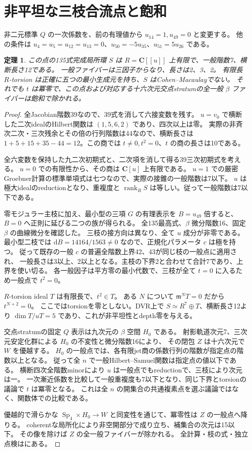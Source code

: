 \documentclass[11pt,a4paper]{ltjsarticle}
\newcommand{\CC}{\mathbf C}
\newcommand{\dd}{\mathrm d}
\DeclareMathOperator{\Sp}{Sp}
\DeclareMathOperator{\rank}{rank}
\newtheorem{theorem}{定理}[section]
\theoremstyle{remark}
\begin{document}
\section{非平坦な三枝合流点と飽和}
非二元標準 $Q$ の一次係数を、前の有理値から $u_{14}=1,u_{49}=0$ と変更する。
他の条件は $u_4=u_5=u_{12}=u_{13}=0$、$u_{50}=-5u_{35}$、$u_{51}=5u_{26}$ である。
\begin{theorem}\label{thm:zero49-v36}
この点の135式完成局所環 $S$ は $R=\CC[[u]]$ 上有限で、一般階数7、横断長さ12である。
一般ファイバーは三因子からなり、長さは2、3、2。
有限長 $R$-torsion は正確に五つの最小生成元を持ち、$S$ はCohen--Macaulayでない。
それでも $t$ は冪零で、この点および対応する十六次元交点stratumの全一般 $\beta$ ファイバーは飽和で除かれる。
\end{theorem}
\begin{proof}
全Jacobian階数39なので、39式を消して六接変数を残す。
$u=v_0$ で横断した二次idealのHilbert関数は $(1,5,6,2)$ であり、四次以上は零。
実際の非斉次二次・三次残余とその倍の行列階数は44なので、横断長さは
$1+5+15+35-44=12$。この商では $t\ne0,t^2=0$、$t$ の商の長さは10である。

全六変数を保持した九二次初期式と、二次項を消して得る39三次初期式を考える。
$u=0$ での有限性から、その商は $\CC[u]$ 上有限である。
$u=1$ での厳密Groebner計算の標準単項式は七つなので、実際の接錐の一般階数は7以下。
$u$ は極大idealのreductionとなり、重複度と $\rank_R S$ は等しい。従って一般階数は7以下である。

零モジュラー主枝に加え、最小型の三項 $G$ の有理表示を $B=u_{49}$ 倍すると、
$B=0$ へ正則に延びる二つの族が得られる。
全135最高式、$\beta$ 微分階数16、固定 $\beta$ の曲線微分を確認した。
三枝の接方向は異なり、全て $u$ 成分が非零である。
最小型二枝では $\dd B=14164/1563\ne0$ なので、正規化パラメータ $c$ は極を持つ。
従って既存の一般 $c$ の普遍全階数上界42、43が同じ枝の一般点に適用され、
一般長さは3以上、2以上となる。主枝の下界2と合わせて合計7であり、上界を使い切る。
各一般因子は平方零の最小代数で、三枝が全て $t=0$ に入るため一般点で $t^2=0$。

$R$-torsion ideal $T$ は有限長で、$t^2\in T$。
ある $N$ について $\mathfrak m^NT=0$ だから $t^{N+2}=0$。
ここではtorsionを零としない。DVR上で $S\simeq R^7\oplus T$、横断長さ12より
$\dim T/uT=5$ であり、これが非平坦性とdepth零を与える。

交点stratumの固定 $Q$ 表示は九次元の $\beta$ 空間 $H_0$ である。
射影軌道次元7、三次元安定化群による $H_0$ の不変性と微分階数16により、
その閉包 $Z$ は十六次元で $W$ を優越する。
$H_0$ の一般点では、各有限jet商の係数行列の階数が指定点の階数以上となる。
従って全 $n$ で一般Hilbert--Samuel関数は指定点の値以下である。
横断四次全階数minorにより $u$ は一般点でもreductionで、三枝により次元は一。
一次漸近係数を比較して一般重複度も7以下となり、同じ下界とtorsionの議論で $t$ は冪零となる。
これは全 $n$ の開集合の共通複素点を選ぶ議論ではなく、関数体での比較である。

優越的で滑らかな $\Sp_4\times H_0\to W$ と同変性を通じて、冪零性は $Z$ の一般点へ降りる。
coherentな局所化により非空開部分で成り立ち、補集合の次元は15以下。
その像を除けば $Z$ の全一般ファイバーが除かれる。
全計算・枝の式・独立点検は\cite{zero49-v36}にある。
\end{proof}
\end{document}

